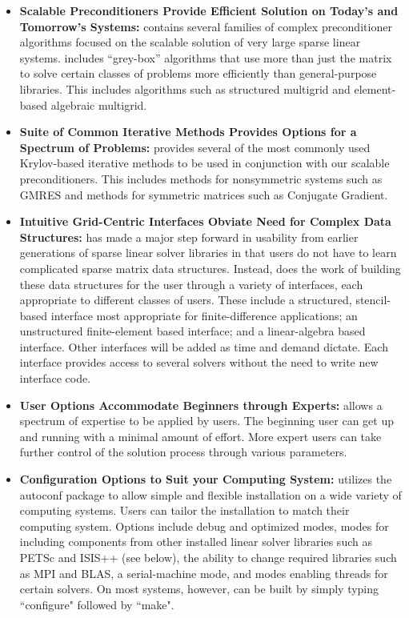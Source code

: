 \begin{itemize}

\item
{\bf Scalable Preconditioners Provide Efficient Solution on Today's and Tomorrow's
Systems:} \hypre{} 
contains several families of complex preconditioner algorithms focused on the
scalable solution of very 
large sparse linear systems. \hypre{} includes ``grey-box'' algorithms that use more
than just the matrix to solve certain classes of problems more efficiently
than
general-purpose libraries. This includes algorithms such as 
structured multigrid and element-based algebraic multigrid.

\item
{\bf Suite of Common Iterative Methods Provides Options for a Spectrum of Problems:}
\hypre{} provides 
several of the most commonly used Krylov-based iterative methods to be used
in conjunction with our 
scalable preconditioners. This includes methods for nonsymmetric systems
such as GMRES and
methods for 
symmetric matrices such as Conjugate Gradient.

\item
{\bf Intuitive Grid-Centric Interfaces Obviate Need for Complex Data Structures:}
\hypre{} has made a 
major step forward in usability from earlier generations of sparse linear
solver libraries in that users do not 
have to learn complicated sparse matrix data structures. Instead, \hypre{} does
the work of building these 
data structures for the user through a variety of interfaces, each appropriate
to different classes of users. 
These include a structured, stencil-based interface most appropriate for
finite-difference applications; an 
unstructured finite-element based interface; and a linear-algebra based
interface. Other interfaces will be 
added as time and demand dictate.
Each interface provides access to several solvers without the need to
write new interface code.

\item
{\bf User Options Accommodate Beginners through Experts:} \hypre{} allows a
spectrum of expertise 
to be applied by users. The beginning user can get up and running with a
minimal amount of effort. More expert users can take further
control of the solution process 
through various parameters. 

\item
{\bf Configuration Options to Suit your Computing System:} \hypre{} utilizes the
autoconf package to 
allow simple and flexible installation on a wide variety of computing systems.
Users can tailor the 
installation to match their computing system. Options include debug and
optimized modes, modes for 
including components from other installed linear solver libraries such as PETSc
and ISIS++ (see below), 
the ability to change required libraries such as MPI and BLAS, a
serial-machine mode, and modes 
enabling threads for certain solvers. On most systems, however, \hypre{} can be
built by simply typing ``configure" followed by ``make".


\end{itemize}
